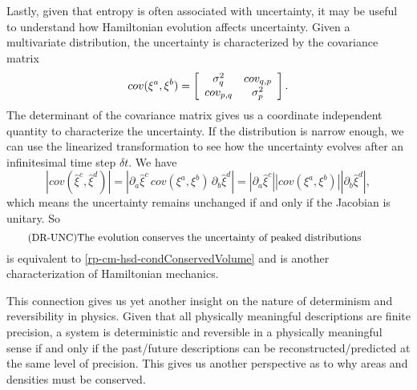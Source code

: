 Lastly, given that entropy is often associated with uncertainty, it may be useful to understand how Hamiltonian evolution affects uncertainty. Given a multivariate distribution, the uncertainty is characterized by the covariance matrix
\begin{equation}
	cov(\xi^a, \xi^b) = \left[\begin{array}{ c c }
		\sigma^2_q & cov_{q, p} \\
		cov_{p, q} & \sigma^2_p \\
	\end{array} \right].
\end{equation}
The determinant of the covariance matrix gives us a coordinate independent quantity to characterize the uncertainty. If the distribution is narrow enough, we can use the linearized transformation to see how the uncertainty evolves after an infinitesimal time step $\delta t$. We have
\begin{equation}
	\left| cov(\hat{\xi}^c, \hat{\xi}^d) \right| = \left| \partial_a \hat{\xi}^c  \, cov(\xi^a, \xi^b) \, \partial_b \hat{\xi}^d  \right| = \left| \partial_a \hat{\xi}^c \right| \left| cov(\xi^a, \xi^b) \right| \left| \partial_b \hat{\xi}^d  \right|,
\end{equation}
which means the uncertainty remains unchanged if and only if the Jacobian is unitary. So
\begin{equation}\label{rp-cm-hsd-condUncertainty}
	\tag{DR-UNC}
	\eqtext{The evolution conserves the uncertainty of peaked distributions}	
\end{equation}
is equivalent to \ref{rp-cm-hsd-condConservedVolume} and is another characterization of Hamiltonian mechanics.

This connection gives us yet another insight on the nature of determinism and reversibility in physics. Given that all physically meaningful descriptions are finite precision, a system is deterministic and reversible in a physically meaningful sense if and only if the past/future descriptions can be reconstructed/predicted at the same level of precision. This gives us another perspective as to why areas and densities must be conserved.


